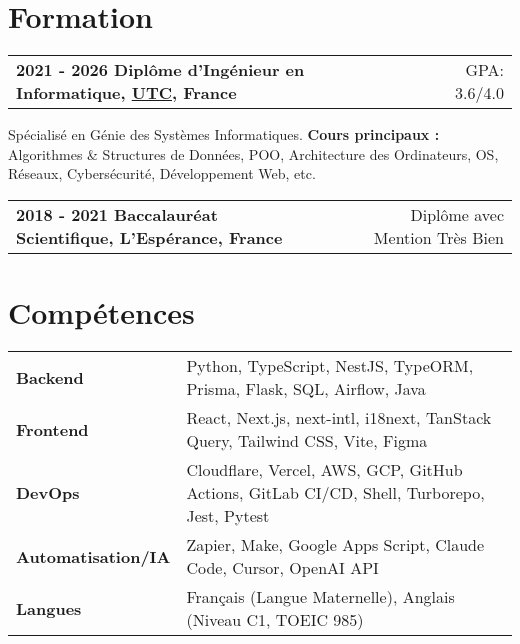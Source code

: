 \documentclass[a4paper,10pt]{article}
\makeatletter
\newenvironment{jobshort}[2]
    {
    \begin{tabularx}{\linewidth}{@{}l X r@{}}
    \textbf{#1} & \hfill &  #2 \\[2pt]
    \end{tabularx}
    } {}
\makeatother
\begin{document}
\section{Formation}

\begin{jobshort}{2021 - 2026    Diplôme d'Ingénieur en Informatique, \href{https://www.utc.fr}{UTC}, France}{GPA: 3.6/4.0}
    Spécialisé en Génie des Systèmes Informatiques. \textbf{Cours principaux :} Algorithmes \& Structures de Données, POO, Architecture des Ordinateurs, OS, Réseaux, Cybersécurité, Développement Web, etc.
\end{jobshort}

\begin{jobshort}{2018 - 2021    Baccalauréat Scientifique, L'Espérance, France}{Diplôme avec Mention Très Bien}
\end{jobshort}

\section{Compétences}

\begin{tabularx}{\linewidth}{@{}l X@{}}
    \textbf{Backend}           & \normalsize{Python, TypeScript, NestJS, TypeORM, Prisma, Flask, SQL, Airflow, Java}                     \\
    \textbf{Frontend}          & \normalsize{React, Next.js, next-intl, i18next, TanStack Query, Tailwind CSS, Vite, Figma}              \\
    \textbf{DevOps}            & \normalsize{Cloudflare, Vercel, AWS, GCP, GitHub Actions, GitLab CI/CD, Shell, Turborepo, Jest, Pytest} \\
    \textbf{Automatisation/IA} & \normalsize{Zapier, Make, Google Apps Script, Claude Code, Cursor, OpenAI API}                          \\
    \textbf{Langues}           & \normalsize{Français (Langue Maternelle), Anglais (Niveau C1, TOEIC 985)}                               \\
\end{tabularx}
\end{document}
